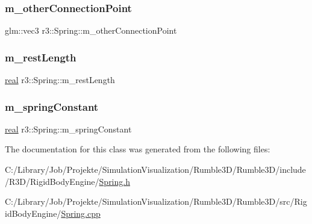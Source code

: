 \subsubsection{\texorpdfstring{m\+\_\+other\+Connection\+Point}{m\_otherConnectionPoint}}
{\footnotesize\ttfamily glm\+::vec3 r3\+::\+Spring\+::m\+\_\+other\+Connection\+Point\hspace{0.3cm}{\ttfamily [protected]}}

\mbox{\label{classr3_1_1_spring_ad1c8ba98c782bee7f9896d0c868b9ee7}} 
\subsubsection{\texorpdfstring{m\+\_\+rest\+Length}{m\_restLength}}
{\footnotesize\ttfamily \mbox{\hyperlink{namespacer3_ab2016b3e3f743fb735afce242f0dc1eb}{real}} r3\+::\+Spring\+::m\+\_\+rest\+Length\hspace{0.3cm}{\ttfamily [protected]}}

\mbox{\label{classr3_1_1_spring_a06963e33fd2c3f8e25ddd345324b292b}} 
\subsubsection{\texorpdfstring{m\+\_\+spring\+Constant}{m\_springConstant}}
{\footnotesize\ttfamily \mbox{\hyperlink{namespacer3_ab2016b3e3f743fb735afce242f0dc1eb}{real}} r3\+::\+Spring\+::m\+\_\+spring\+Constant\hspace{0.3cm}{\ttfamily [protected]}}



The documentation for this class was generated from the following files\+:\begin{DoxyCompactItemize}
\item 
C\+:/\+Library/\+Job/\+Projekte/\+Simulation\+Visualization/\+Rumble3\+D/\+Rumble3\+D/include/\+R3\+D/\+Rigid\+Body\+Engine/\mbox{\hyperlink{_spring_8h}{Spring.\+h}}\item 
C\+:/\+Library/\+Job/\+Projekte/\+Simulation\+Visualization/\+Rumble3\+D/\+Rumble3\+D/src/\+Rigid\+Body\+Engine/\mbox{\hyperlink{_spring_8cpp}{Spring.\+cpp}}\end{DoxyCompactItemize}
